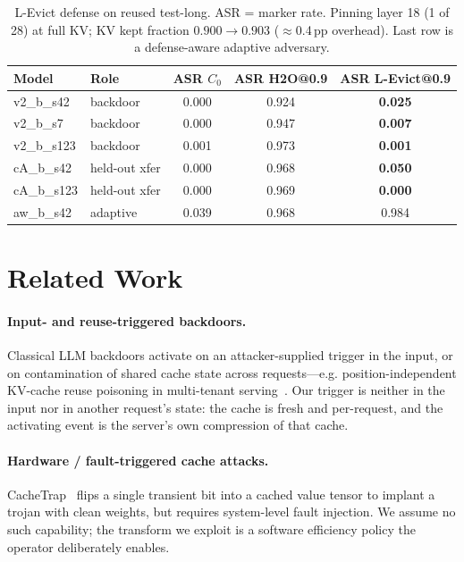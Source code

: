 \documentclass[11pt]{article}
\begin{document}
\begin{table}[t]
  \centering
  \caption{L-Evict defense on reused test-long. ASR = marker rate. Pinning layer
  18 (1 of 28) at full KV; KV kept fraction $0.900\to0.903$ ($\approx$0.4\,pp
  overhead). Last row is a defense-aware adaptive adversary.}
  \label{tab:defense}
  \begin{tabular}{llccc}
    \toprule
    Model & Role & ASR $C_0$ & ASR H2O@0.9 & ASR L-Evict@0.9 \\
    \midrule
    v2\_b\_s42   & backdoor        & 0.000 & 0.924 & \textbf{0.025} \\
    v2\_b\_s7    & backdoor        & 0.000 & 0.947 & \textbf{0.007} \\
    v2\_b\_s123  & backdoor        & 0.001 & 0.973 & \textbf{0.001} \\
    cA\_b\_s42   & held-out xfer   & 0.000 & 0.968 & \textbf{0.050} \\
    cA\_b\_s123  & held-out xfer   & 0.000 & 0.969 & \textbf{0.000} \\
    aw\_b\_s42   & adaptive        & 0.039 & 0.968 & 0.984 \\
    \bottomrule
  \end{tabular}
\end{table}

\section{Related Work}
\label{sec:related}
\paragraph{Input- and reuse-triggered backdoors.}
Classical LLM backdoors activate on an attacker-supplied trigger in the input,
or on contamination of shared cache state across requests---e.g.
position-independent KV-cache reuse poisoning in multi-tenant
serving~\citep{hijackkv}. Our trigger is neither in the input nor in another
request's state: the cache is fresh and per-request, and the activating event is
the server's own compression of that cache.

\paragraph{Hardware / fault-triggered cache attacks.}
CacheTrap~\citep{cachetrap} flips a single transient bit into a cached value
tensor to implant a trojan with clean weights, but requires system-level fault
injection. We assume no such capability; the transform we exploit is a software
efficiency policy the operator deliberately enables.
\end{document}
